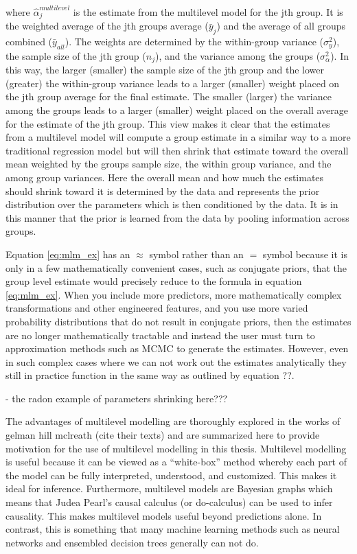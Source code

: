 where $\hat{\alpha}_j^{multilevel}$ is the estimate from the multilevel model for the jth group. It is the weighted average of the jth groups average ($\bar{y}_j$) and the average of all groups combined ($\bar{y}_{all}$). The weights are determined by the within-group variance ($\sigma_y^2$), the sample size of the jth group ($n_j$), and the variance among the groups ($\sigma_{\alpha}^2$). In this way, the larger (smaller) the sample size of the jth group and the lower (greater) the within-group variance leads to a larger (smaller) weight placed on the jth group average for the final estimate. The smaller (larger) the variance among the groups leads to a larger (smaller) weight placed on the overall average for the estimate of the jth group. This view makes it clear that the estimates from a multilevel model will compute a group estimate in a similar way to a more traditional regression model but will then shrink that estimate toward the overall mean weighted by the groups sample size, the within group variance, and the among group variances. Here the overall mean and how much the estimates should shrink toward it is determined by the data and represents the prior distribution over the parameters which is then conditioned by the data. It is in this manner that the prior is learned from the data by pooling information across groups.

Equation \ref{eq:mlm_ex} has an $\approx$ symbol rather than an $=$ symbol because it is only in a few mathematically convenient cases, such as conjugate priors, that the group level estimate would precisely reduce to the formula in equation \ref{eq:mlm_ex}. When you include more predictors, more mathematically complex transformations and other engineered features, and you use more varied probability distributions that do not result in conjugate priors, then the estimates are no longer mathematically tractable and instead the user must turn to approximation methods such as MCMC to generate the estimates. However, even in such complex cases where we can not work out the estimates analytically they still in practice function in the same way as outlined by equation ??.

- the radon example of parameters shrinking here???

The advantages of multilevel modelling are thoroughly explored in the works of \cite{Gelman2014} \cite{Gelman2006} \cite{McElreath2020} gelman hill mclreath (cite their texts) and are summarized here to provide motivation for the use of multilevel modelling in this thesis. Multilevel modelling is useful because it can be viewed as a “white-box” method whereby each part of the model can be fully interpreted, understood, and customized. This makes it ideal for inference. Furthermore, multilevel models are Bayesian graphs which means that Judea Pearl’s causal calculus (or do-calculus) can be used to infer causality. This makes multilevel models useful beyond predictions alone. In contrast, this is something that many machine learning methods such as neural networks and ensembled decision trees generally can not do.

